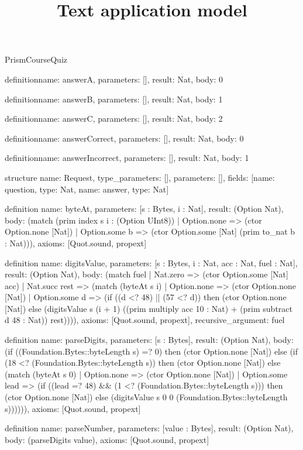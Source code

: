 \begin{lexlean}{PrismCourseQuiz}
\title{Text application model}
\begin{semanticmodule}
definition{name: answerA, parameters: [], result: Nat, body: 0}

definition{name: answerB, parameters: [], result: Nat, body: 1}

definition{name: answerC, parameters: [], result: Nat, body: 2}

definition{name: answerCorrect, parameters: [], result: Nat, body: 0}

definition{name: answerIncorrect, parameters: [], result: Nat, body: 1}

structure{
  name: Request,
  type_parameters: [],
  parameters: [],
  fields: [{name: question, type: Nat}, {name: answer, type: Nat}]
}

definition{
  name: byteAt,
  parameters: [s : Bytes, i : Nat],
  result: (Option Nat),
  body: (match (prim index s i : (Option UInt8))
    | Option.none => (ctor Option.none [Nat])
    | Option.some b => (ctor Option.some [Nat] (prim to_nat b : Nat))),
  axioms: [Quot.sound, propext]
}

definition{
  name: digitsValue,
  parameters: [s : Bytes, i : Nat, acc : Nat, fuel : Nat],
  result: (Option Nat),
  body: (match fuel
    | Nat.zero => (ctor Option.some [Nat] acc)
    | Nat.succ rest => (match (byteAt s i)
      | Option.none => (ctor Option.none [Nat])
      | Option.some d => (if ((d <? 48) || (57 <? d)) then (ctor Option.none [Nat]) else (digitsValue s (i + 1) ((prim multiply acc 10 : Nat) + (prim subtract d 48 : Nat)) rest)))),
  axioms: [Quot.sound, propext],
  recursive_argument: fuel
}

definition{
  name: parseDigits,
  parameters: [s : Bytes],
  result: (Option Nat),
  body: (if ((Foundation.Bytes::byteLength s) =? 0) then (ctor Option.none [Nat]) else (if (18 <? (Foundation.Bytes::byteLength s)) then (ctor Option.none [Nat]) else (match (byteAt s 0)
    | Option.none => (ctor Option.none [Nat])
    | Option.some lead => (if ((lead =? 48) && (1 <? (Foundation.Bytes::byteLength s))) then (ctor Option.none [Nat]) else (digitsValue s 0 0 (Foundation.Bytes::byteLength s)))))),
  axioms: [Quot.sound, propext]
}

definition{
  name: parseNumber,
  parameters: [value : Bytes],
  result: (Option Nat),
  body: (parseDigits value),
  axioms: [Quot.sound, propext]
}


\end{semanticmodule}
\end{lexlean}
